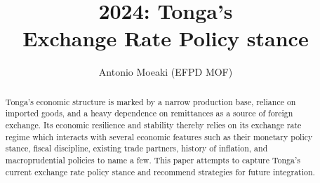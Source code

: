 \documentclass[12pt]{article}
\title{2024: Tonga's\\ Exchange Rate Policy stance }
\author{Antonio Moeaki (EFPD MOF) }
\begin{document}
 

\maketitle

\begin{abstract}
Tonga’s economic structure is marked by a narrow production base, reliance on imported goods, and a heavy dependence on remittances as a source of foreign exchange. Its economic resilience and stability thereby relies on its exchange rate regime which interacts with several economic features such as their monetary policy stance, fiscal discipline, existing trade partners, history of inflation, and macroprudential policies to name a few. This paper attempts to capture Tonga's current exchange rate policy stance and recommend strategies for future integration.



\end{abstract}




     \tableofcontents
\end{document}

